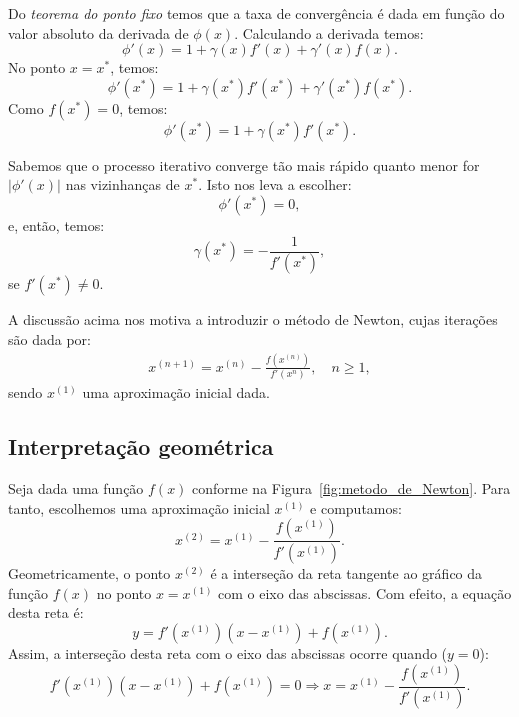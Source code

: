 Do \emph{teorema do ponto fixo} temos que a taxa de convergência é dada em função do valor absoluto da derivada de $\phi(x)$. Calculando a derivada temos:
\begin{equation*}
  \phi'(x)=1+\gamma(x)f'(x)+\gamma'(x)f(x).
\end{equation*}
No ponto $x = x^*$, temos:
\begin{equation*}
  \phi'(x^*) = 1 + \gamma(x^*)f'(x^*) + \gamma'(x^*)f(x^*).
\end{equation*}
Como $f(x^*)=0$, temos:
\begin{equation*}
  \phi'(x^*) = 1 + \gamma(x^*)f'(x^*).
\end{equation*}

Sabemos que o processo iterativo converge tão mais rápido quanto menor for $|\phi'(x)|$ nas vizinhanças de $x^*$. Isto nos leva a escolher:
\begin{equation*}
  \phi'(x^*) = 0,
\end{equation*}
e, então, temos:
\begin{equation*}
  \gamma(x^*) = -\frac{1}{f'(x^*)},
\end{equation*}
se $f'(x^*)\neq 0$.

A discussão acima nos motiva a introduzir o método de Newton, cujas iterações são dada por:
\begin{align*}
  x^{(n+1)} = x^{(n)} - \frac{f\left(x^{(n)}\right)}{f'\left(x^{n}\right)}, \quad n\geq 1,
\end{align*}
sendo $x^{(1)}$ uma aproximação inicial dada.

\subsection{Interpretação geométrica}

Seja dada uma função $f(x)$ conforme na Figura~\ref{fig:metodo_de_Newton}. Para tanto, escolhemos uma aproximação inicial $x^{(1)}$ e computamos:
\begin{equation*}
  x^{(2)} = x^{(1)} - \frac{f(x^{(1)})}{f'(x^{(1)})}.
\end{equation*}
Geometricamente, o ponto $x^{(2)}$ é a interseção da reta tangente ao gráfico da função $f(x)$ no ponto $x = x^{(1)}$ com o eixo das abscissas. Com efeito, a equação desta reta é:
\begin{equation*}
  y = f'(x^{(1)})(x - x^{(1)}) + f(x^{(1)}).
\end{equation*}
Assim, a interseção desta reta com o eixo das abscissas ocorre quando ($y=0$):
\begin{equation*}
  f'(x^{(1)})(x - x^{(1)}) + f(x^{(1)}) = 0\Rightarrow x = x^{(1)} - \frac{f(x^{(1)})}{f'(x^{(1)})}.
\end{equation*}


